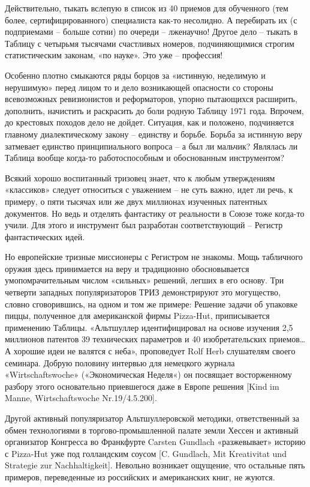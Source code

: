 \documentclass[11pt,a4paper]{article}
\begin{document}
Действительно, тыкать вслепую в список из 40 приемов для обученного (тем
более, сертифицированного) специалиста как-то несолидно. А перебирать их (с
подприемами -- больше сотни) по очереди -- лженаучно! Другое дело -- тыкать в
Таблицу с четырьмя тысячами счастливых номеров, подчиняющимися строгим
статистическим законам, «по науке». Это уже -- профессия!

Особенно плотно смыкаются ряды борцов за «истинную, неделимую и нерушимую»
перед лицом то и дело возникающей опасности со стороны всевозможных
ревизионистов и реформаторов, упорно пытающихся расширить, дополнить,
начистить и раскрасить до боли родную Таблицу 1971 года. Впрочем, до крестовых
походов дело не дойдет. Ситуация, как и положено, подчиняется главному
диалектическому закону -- единству и борьбе. Борьба за истинную веру затмевает
единство принципиального вопроса -- а был ли мальчик? Являлась ли Таблица
вообще когда-то работоспособным и обоснованным инструментом?

Всякий хорошо воспитанный тризовец знает, что к любым утверждениям «классиков»
следует относиться с уважением -- не суть важно, идет ли речь, к примеру, о
пяти тысячах или же двух миллионах изученных патентных документов. Но ведь и
отделять фантастику от реальности в Союзе тоже когда-то учили. Для этого и
инструмент был разработан соответствующий -- Регистр фантастических идей.

Но европейские тризные миссионеры с Регистром не знакомы. Мощь табличного
оружия здесь принимается на веру и традиционно обосновывается
умопомрачительным числом «сильных» решений, легших в его основу. Три четверти
западных популяризаторов ТРИЗ демонстрируют это могущество, словно
сговорившись, на одном и том же примере: Решение задачи об упаковке пиццы,
полученное для американской фирмы Pizza-Hut, приписывается применению
Таблицы. «Альтшуллер идентифицировал на основе изучения 2,5 миллионов патентов
39 технических параметров и 40 изобретательских приемов… А хорошие идеи не
валятся с неба», проповедует Rolf Herb слушателям своего семинара. Добрую
половину интервью для немецкого журнала «Wirtschaftswoche» («Экономическая
Неделя«) он посвящает восторженному разбору этого основательно приевшегося
даже в Европе решения [Kind im Manne, Wirtschaftswoche Nr.19/4.5.200].

Другой активный популяризатор Альтшуллеровской методики, ответственный за
обмен технологиями в торгово-промышленной палате земли Хессен и активный
организатор Конгресса во Франкфурте Carsten Gundlach «разжевывает» историю с
Pizza-Hut уже под голландским соусом [C. Gundlach, Mit Kreativitat und
  Strategie zur Nachhaltigkeit]. Невольно возникает ощущение, что остальные
пять примеров, переведенные из российских и американских книг, не жуются.
\end{document}
